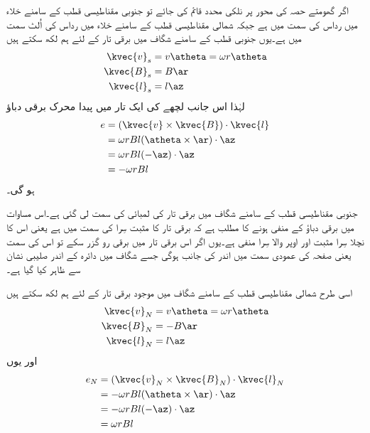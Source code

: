 اگر گھومتے حصہ کی محور پر نلکی محدد قائم کی جائے تو جنوبی مقناطیسی قطب کے سامنے خلاء میں  رداس کی سمت میں ہے جبکہ شمالی مقناطیسی قطب کے سامنے  خلاء میں   رداس کی اُلٹ سمت میں ہے۔یوں جنوبی قطب کے سامنے شگاف میں برقی تار   کے لئے ہم لکھ سکتے ہیں
\begin{gather}
\begin{aligned}
\kvec{v}_s&=v \atheta =\omega r \atheta\\
\kvec{B}_s&=B \ar\\
\kvec{l}_s&=l \az
\end{aligned}
\end{gather}
لہٰذا اس جانب لچھے کی ایک تار میں پیدا محرک برقی دباؤ
\begin{gather}
\begin{aligned}
e&=(\kvec{v} \times \kvec{B}) \cdot \kvec{l}\\
&=\omega r B l  (\atheta \times \ar) \cdot \az\\
&=\omega r B l  (-\az) \cdot \az\\
&=-\omega r B l 
\end{aligned}
\end{gather}
ہو گی۔

جنوبی مقناطیسی قطب کے سامنے شگاف میں برقی تار کی لمبائی کی سمت  لی گئی ہے۔اس مساوات میں برقی دباؤ کے منفی ہونے کا مطلب ہے کہ برقی تار کا مثبت سِرا  کی سمت میں ہے یعنی اس کا نچلا سِرا مثبت اور اوپر والا سِرا منفی ہے۔یوں اگر اس برقی تار میں برقی رو گزر سکے تو اس کی سمت  یعنی صفحہ کی عمودی سمت میں اندر کی جانب ہوگی جسے شگاف میں دائرہ کے اندر صلیبی نشان سے ظاہر کیا گیا ہے۔ 

اسی طرح شمالی مقناطیسی قطب کے سامنے شگاف میں موجود برقی تار کے لئے ہم لکھ سکتے ہیں
\begin{gather}
\begin{aligned}
\kvec{v}_N&=v \atheta=\omega r \atheta\\
\kvec{B}_N&=-B \ar\\
\kvec{l}_N&=l \az
\end{aligned}
\end{gather}
اور یوں 
\begin{gather}
\begin{aligned}
e_N&=(\kvec{v}_N \times \kvec{B}_N)\cdot \kvec{l}_N\\
&=-\omega r B l (\atheta \times \ar) \cdot \az\\
&=-\omega r B l (-\az) \cdot \az\\
&=\omega r B l 
\end{aligned}
\end{gather}

